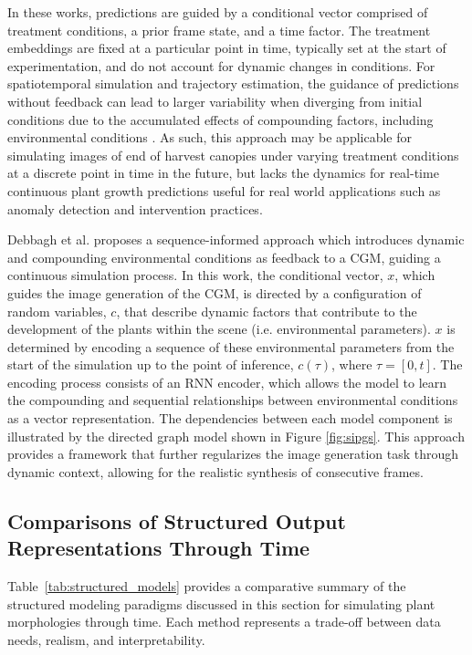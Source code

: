 \documentclass{article}
\begin{document}
In these works, predictions are guided by a conditional vector comprised of treatment conditions, a prior frame state, and a time factor. The treatment embeddings are fixed at a particular point in time, typically set at the start of experimentation, and do not account for dynamic changes in conditions. For spatiotemporal simulation and trajectory estimation, the guidance of predictions without feedback can lead to larger variability when diverging from initial conditions due to the accumulated effects of compounding factors, including environmental conditions \cite{Drees_2024}. As such, this approach may be applicable for simulating images of end of harvest canopies under varying treatment conditions at a discrete point in time in the future, but lacks the dynamics for real-time continuous plant growth predictions useful for real world applications such as anomaly detection and intervention practices.

Debbagh et al. \cite{Debbagh2024SIPGS} proposes a sequence-informed approach which introduces dynamic and compounding environmental conditions as feedback to a CGM, guiding a continuous simulation process. In this work, the conditional vector, $x$, which guides the image generation of the CGM, is directed by a configuration of random variables, $c$, that describe dynamic factors that contribute to the development of the plants within the scene (i.e. environmental parameters). $x$ is determined by encoding a sequence of these environmental parameters from the start of the simulation up to the point of inference, $c(\tau)$, where $\tau = [0,t]$. The encoding process consists of an RNN encoder, which allows the model to learn the compounding and sequential relationships between environmental conditions as a vector representation. The dependencies between each model component is illustrated by the directed graph model shown in Figure \ref{fig:sipgs}. This approach provides a framework that further regularizes the image generation task through dynamic context, allowing for the realistic synthesis of consecutive frames.

\subsection{Comparisons of Structured Output Representations Through Time}

Table~\ref{tab:structured_models} provides a comparative summary of the structured modeling paradigms discussed in this section for simulating plant morphologies through time. Each method represents a trade-off between data needs, realism, and interpretability.
\end{document}
